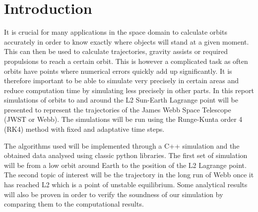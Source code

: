 \section{Introduction}
It is crucial for many applications in the space domain to calculate orbits accurately in order to know exactly where objects will stand at a given moment. This can then be used to calculate trajectories, gravity assists or required propulsions to reach a certain orbit. This is however a complicated task as often orbits have points where numerical errors quickly add up significantly. It is therefore important to be able to simulate very precisely in certain areas and reduce computation time by simulating less precisely in other parts. In this report simulations of orbits to and around the L2 Sun-Earth Lagrange point will be presented to represent the trajectories of the James Webb Space Telescope (JWST or Webb). The simulations will be run using the Runge-Kunta order 4 (RK4) method with fixed and adaptative time steps.

The algorithms used will be implemented through a C++ simulation and the obtained data
analysed using classic python libraries. The first set of simulation will be from a low orbit around Earth to the position of the L2 Lagrange point. The second topic of interest will be the trajectory in the long run of Webb once it has reached L2 which is a point of unstable equilibrium. Some analytical results will also be proven in order to verify the soundness of our simulation by comparing them to the computational results.